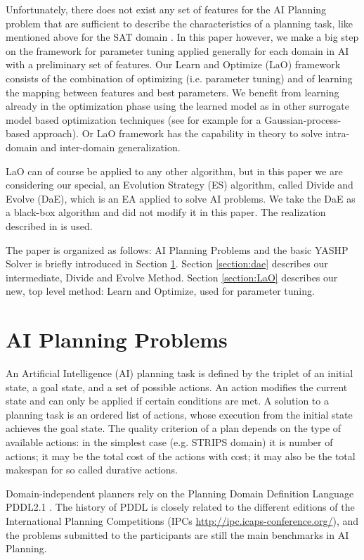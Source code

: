\documentclass{acm_proc_article-sp}
\begin{document}
Unfortunately, there does not exist any set of features for the AI Planning problem that are sufficient to describe the characteristics of a planning task, like mentioned above for the SAT domain \cite{Hutter06}. In this paper however, we make a big step on the framework for parameter tuning applied generally for each domain in AI with a preliminary set of features. Our Learn and Optimize (LaO) framework consists of the combination of optimizing (i.e. parameter tuning) and of learning the mapping between features and best parameters. We benefit from learning already in the optimization phase using the learned model as in other surrogate model based optimization techniques (see for example \cite{Bardenet} for a Gaussian-process-based approach). Or LaO framework has the capability in theory to solve intra-domain and inter-domain generalization.

LaO can of course be applied to any other algorithm, but in this paper we are considering our special, an Evolution Strategy (ES) algorithm, called Divide and Evolve (DaE), which is an EA applied to solve AI problems. We take the DaE as a black-box algorithm and did not modify it in this paper. The realization described in \cite{BibEvoCop:2010} is used. 

The paper is organized as follows: AI Planning Problems and the basic YASHP Solver is briefly introduced in Section \ref{section:planning}. Section \ref{section:dae} describes our intermediate, Divide and Evolve Method. Section \ref{section:LaO} describes our new, top level method: Learn and Optimize, used for parameter tuning. 

\section{AI Planning Problems}
\label{section:planning}

An Artificial Intelligence (AI) planning task is defined by the triplet of an initial state, a goal state, and a set of possible actions. An action modifies the current state and can only be applied if certain conditions are met. A solution to a planning task is an ordered list of actions, whose execution from the initial state achieves the goal state. The quality criterion of a plan depends on the type of available actions: in the simplest case (e.g. STRIPS domain) it is number of actions; it may be the total cost of the actions with cost; it may also be the total makespan for so called durative actions.

Domain-independent planners rely on the Planning Domain Definition Language PDDL2.1 \cite{Fox-JAIR-2003}. The history of PDDL is closely related to the different editions of the International Planning Competitions (IPCs \url{http://ipc.icaps-conference.org/}), and the problems submitted to the participants are still the main benchmarks in AI Planning.
\end{document}
